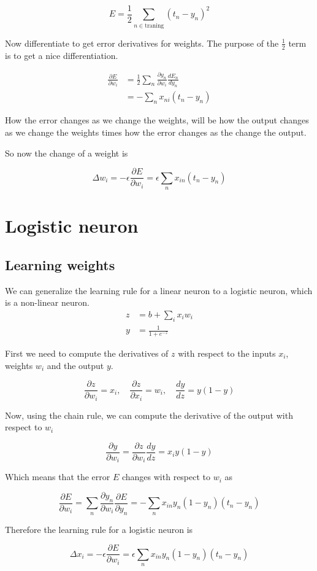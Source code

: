 \documentclass{article}
\begin{document}
\[
    E=\frac{1}{2} \sum_{n\in \text{traning}} {(t_n - y_n)}^2
\]

Now differentiate to get error derivatives for weights. The purpose of the \(\frac{1}{2}\) term is to get a nice differentiation.

\begin{align*}
    \frac{\partial E}{\partial w_i}&=
    \frac{1}{2} \sum_n \frac{\partial y_n}{\partial w_i} \frac{dE_n}{dy_n} \\
    &= - \sum_n x_{ni} (t_n-y_n)
\end{align*}

How the error changes as we change the weights, will be how the output changes as we change the weights
times how the error changes as the change the output.

So now the change of a weight is

\[
    \Delta w_i=-\epsilon \frac{\partial E}{\partial w_i} = \epsilon \sum_n x_{in}(t_n-y_n)
\]



\pagebreak

\section{Logistic neuron}

\subsection{Learning weights}

We can generalize the learning rule for a linear neuron to a logistic neuron, which is a non-linear neuron.
\\
\begin{align*}    
    z&=b+\sum_{i} x_i w_i \\
    y&=\frac{1}{1+e^{-z}}
\end{align*}

First we need to compute the derivatives of \(z\) with respect to the inputs \(x_i\), weights \(w_i\) and the output \(y\).

\[
    \frac{\partial z}{\partial w_i} = x_i,
    \quad
    \frac{\partial z}{\partial x_i} = w_i,
    \quad
    \frac{dy}{dz}=y(1-y)
\]

Now, using the chain rule, we can compute the derivative of the output with respect to \(w_i\)

\[
    \frac{\partial y}{\partial w_i}=\frac{\partial z}{\partial w_i}\frac{dy}{dz}=x_i y(1-y)
\]

Which means that the error \(E\) changes with respect to \(w_i\) as

\[
    \frac{\partial E}{\partial w_i} =
    \sum_n \frac{\partial y_n}{\partial w_i} \frac{\partial E}{\partial y_n} =
    -\sum_n x_{in} y_n (1-y_n)(t_n-y_n)
\]

Therefore the learning rule for a logistic neuron is

\[
    \Delta x_i = -\epsilon \frac{\partial E}{\partial w_i}=\epsilon \sum_n x_{in} y_n (1-y_n)(t_n-y_n)
\]

\end{document}
